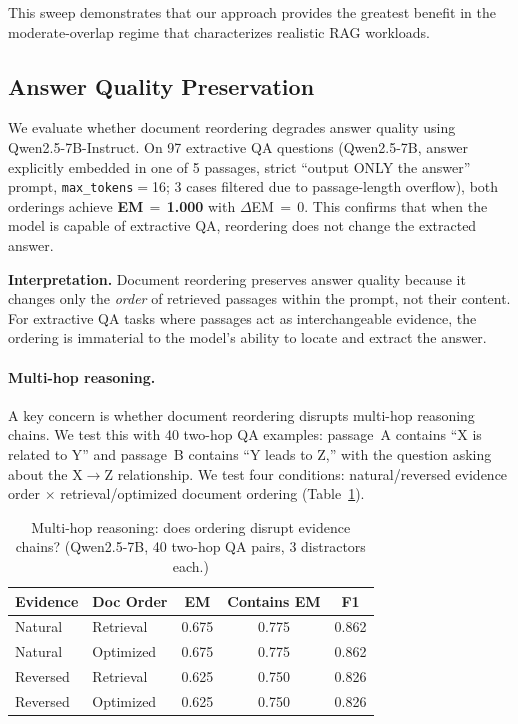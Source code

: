 \documentclass{article}
\begin{document}
This sweep demonstrates that our approach provides the greatest benefit in the moderate-overlap regime that characterizes realistic RAG workloads.

\subsection{Answer Quality Preservation}

We evaluate whether document reordering degrades answer quality using Qwen2.5-7B-Instruct.
On 97 extractive QA questions (Qwen2.5-7B, answer explicitly embedded in one of 5 passages, strict ``output ONLY the answer'' prompt, \texttt{max\_tokens}$=$16; 3 cases filtered due to passage-length overflow), both orderings achieve \textbf{EM\,$=$\,1.000} with $\Delta$EM\,$=$\,0. This confirms that when the model is capable of extractive QA, reordering does not change the extracted answer.

\textbf{Interpretation.} Document reordering preserves answer quality because it changes only the \emph{order} of retrieved passages within the prompt, not their content. For extractive QA tasks where passages act as interchangeable evidence, the ordering is immaterial to the model's ability to locate and extract the answer.

\paragraph{Multi-hop reasoning.}
\label{sec:multihop}

A key concern is whether document reordering disrupts multi-hop reasoning chains. We test this with 40 two-hop QA examples: passage~A contains ``X is related to Y'' and passage~B contains ``Y leads to Z,'' with the question asking about the X$\to$Z relationship. We test four conditions: natural/reversed evidence order $\times$ retrieval/optimized document ordering (Table~\ref{tab:multihop}).

\begin{table}[t]
\caption{Multi-hop reasoning: does ordering disrupt evidence chains? (Qwen2.5-7B, 40 two-hop QA pairs, 3 distractors each.)}
\label{tab:multihop}
\centering
\small
\begin{tabular}{@{}llccc@{}}
\toprule
\textbf{Evidence} & \textbf{Doc Order} & \textbf{EM} & \textbf{Contains EM} & \textbf{F1} \\
\midrule
Natural   & Retrieval  & 0.675 & 0.775 & 0.862 \\
Natural   & Optimized  & 0.675 & 0.775 & 0.862 \\
Reversed  & Retrieval  & 0.625 & 0.750 & 0.826 \\
Reversed  & Optimized  & 0.625 & 0.750 & 0.826 \\
\bottomrule
\end{tabular}
\vspace{-0.5em}
\end{table}
\end{document}
